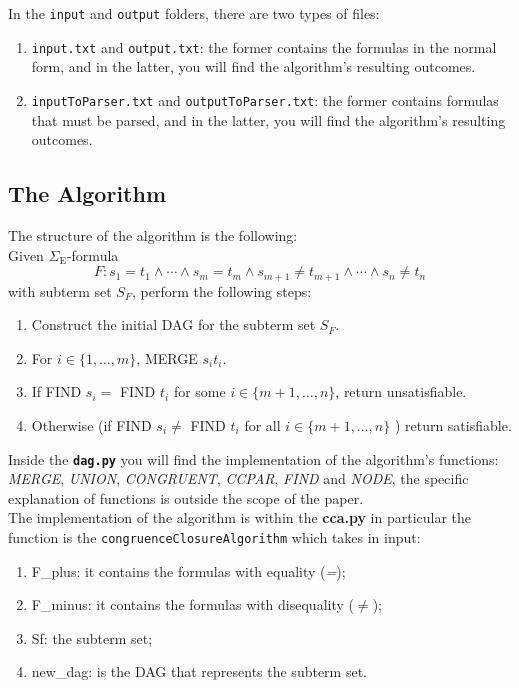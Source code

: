 \documentclass{article}
\begin{document}
In the \texttt{input} and \texttt{output} folders, there are two types of files:
\begin{enumerate}
\item \texttt{input.txt} and \texttt{output.txt}: the former contains the formulas in the normal form, and in the latter, you will find the algorithm's resulting outcomes.
\item \texttt{inputToParser.txt} and \texttt{outputToParser.txt}: the former contains formulas that must be parsed, and in the latter, you will find the algorithm's resulting outcomes.
\end{enumerate}

\subsection{The Algorithm}
The structure of the algorithm is the following:\\
Given $\Sigma_{\mathrm{E}}$-formula
$$
F: s_1=t_1 \wedge \cdots \wedge s_m=t_m \wedge s_{m+1} \neq t_{m+1} \wedge \cdots \wedge s_n \neq t_n
$$
with subterm set $S_F$, perform the following steps:
\begin{enumerate}
    \item Construct the initial DAG for the subterm set $S_F$.
    \item For $i \in\{1, \ldots, m\}$, MERGE $s_i t_i$.
    \item If FIND $s_i=$ FIND $t_i$ for some $i \in\{m+1, \ldots, n\}$, return unsatisfiable.
    \item Otherwise (if FIND $s_i \neq$ FIND $t_i$ for all $i \in\{m+1, \ldots, n\}$ ) return satisfiable.
\end{enumerate}

Inside the \textbf{\texttt{dag.py}} you will find the implementation of the algorithm's functions: \textit{MERGE}, \textit{UNION}, \textit{CONGRUENT}, \textit{CCPAR}, \textit{FIND} and \textit{NODE}, the specific explanation of functions is outside the scope of the paper. \\

The implementation of the algorithm is within the \textbf{cca.py} in particular the function is the \texttt{congruenceClosureAlgorithm} which takes in input: 
\begin{enumerate}
    \item F\_plus: it contains the formulas with equality (\textit{=});
    \item F\_minus: it contains the formulas with disequality (\textit{$\neq$});
    \item Sf: the subterm set;
    \item new\_dag: is the DAG that represents the subterm set.
\end{enumerate}
\end{document}
